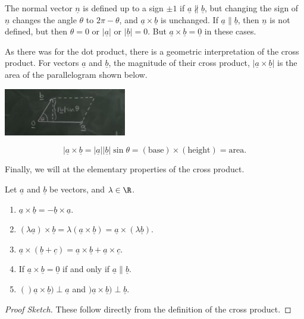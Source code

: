 \documentclass[a4]{scrartcl}
\begin{document}
\begin{remark}
	The normal vector $\underline{n}$ is defined up to a sign $\pm 1$ if $\underline{a} \not \parallel \underline{b}$, but changing the sign of $\underline{n}$ changes the angle $\theta$ to $2 \pi - \theta$, and $\underline{a} \times \underline{b}$ is unchanged. If $\underline{a} \parallel \underline{b}$, then $\underline{n}$ is not defined, but then $\theta = 0$ or $|\underline{a}|$ or $|\underline{b}| = 0$. But $\underline{a} \times \underline{b} = \underline{0}$ in these cases.
\end{remark}

As there was for the dot product, there is a geometric interpretation of the cross product.
For vectors $\underline{a}$ and $\underline{b}$, the magnitude of their cross product, $|\underline{a} \times \underline{b}|$ is the area of the parallelogram shown below.
\begin{center}
	\includegraphics[width=0.4\textwidth]{cross_product_area.png}
\end{center}
$$
|\underline{a} \times \underline{b} = |\underline{a}| |\underline{b}| \sin \theta = (\text{base})\times(\text{height}) = \text{area}.
$$

Finally, we will at the elementary properties of the cross product.

\begin{proposition}
	Let $\underline{a}$ and $\underline{b}$ be vectors, and $\lambda \in \R$.
	\begin{enumerate}[label=(\roman*)]
		\item $\underline{a} \times \underline{b} = - \underline{b} \times \underline{a}$.
		\item $(\lambda \underline{a}) \times \underline{b} = \lambda(\underline{a} \times \underline{b}) = \underline{a} \times (\lambda \underline{b})$.
		\item $\underline{a} \times (\underline{b} + \underline{c}) = \underline{a} \times \underline{b} + \underline{a} \times \underline{c}$.
		\item If $\underline{a} \times \underline{b} = \underline{0}$ if and only if $\underline{a} \parallel \underline{b}$.
		\item $()\underline{a} \times \underline{b}) \perp \underline{a}$ and $)\underline{a} \times \underline{b}) \perp \underline{b}$.
	\end{enumerate}
\end{proposition}
\begin{proof}[Proof Sketch]
	These follow directly from the definition of the cross product.
\end{proof}
\end{document}
